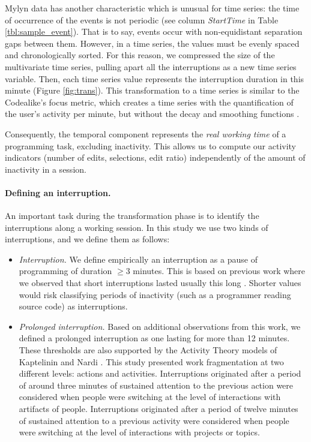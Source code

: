 \documentclass[times]{smrauth}
\newcommand\RR[1]{\textbf{Romain #1}}
\begin{document}


Mylyn data has another characteristic which is unusual for time series: the time of occurrence of the events is not periodic (see column \textit{StartTime} in Table \ref{tbl:sample_event}). That is to say, events occur with non-equidistant separation gaps between them. However, in a time series, the values must be evenly spaced and chronologically sorted. For this reason, we compressed the size of the multivariate time series, pulling apart all the interruptions as a new time series variable. Then, each time series value represents the interruption duration in this minute (Figure \ref{fig:trans}). This transformation to a time series is similar to the Codealike's focus metric, which creates a time series with the quantification of the user's activity per minute, but without the decay and smoothing functions \cite{CLQ15}.



Consequently, the temporal component represents the \textit{real working time} of a programming task, excluding inactivity. This allows us to compute our activity indicators (number of edits, selections, edit ratio) independently of the amount of inactivity in a session.
\paragraph{Defining an interruption.} An important task during the transformation phase is to identify the interruptions along a working session. In this study we use two kinds of interruptions, and we define them as follows:

\begin{itemize}
	\item \textit{Interruption.} We define empirically an interruption as a pause of programming of duration $\geq 3$ minutes. This is based on previous work where we observed that short interruptions lasted usually this long \cite{GM04}. Shorter values would risk classifying periods of inactivity (such as a programmer reading source code) as interruptions.
	
	\item \textit{Prolonged interruption.} Based on additional observations from this work, we defined a prolonged interruption as one lasting for more than 12 minutes. These thresholds are also supported by the Activity Theory models of Kaptelinin and Nardi \cite{KaptelininN07}. This study presented work fragmentation at two different levels: actions and activities. Interruptions originated after a period of around three minutes of sustained attention to the previous action were considered when people were switching at the level of interactions with artifacts of people. Interruptions originated after a period of twelve minutes of sustained attention to a previous activity were considered when people were switching at the level of interactions with projects or topics.  
\end{itemize}
\end{document}
